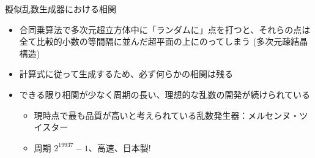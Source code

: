 \begin{frame}[t,fragile]{擬似乱数生成器における相関}
  \begin{itemize}
  \item 合同乗算法で多次元超立方体中に「ランダムに」点を打つと、それらの点は全て比較的小数の等間隔に並んだ超平面の上にのってしまう (多次元疎結晶構造)
  \item 計算式に従って生成するため、必ず何らかの相関は残る
  \item できる限り相関が少なく周期の長い、理想的な乱数の開発が続けられている
    \begin{itemize}
    \item 現時点で最も品質が高いと考えられている乱数発生器：メルセンヌ・ツイスター
    \item 周期 $2^{19937}-1$、高速、日本製!
    \end{itemize}
  \end{itemize}
\end{frame}

